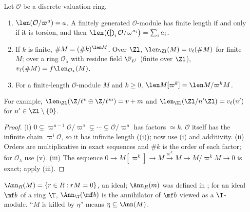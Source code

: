 \begin{proposition}\label{prop:modules:length-dvr}
Let $\mathcal O$ be a discrete valuation ring.
\begin{enumerate}[label=(\roman*)]
\item $\len(\mathcal O/\varpi^a)=a$. A finitely generated $\mathcal O$-module has finite length if and only if it is torsion, and then
$\len\bigl(\bigoplus_i\mathcal O/\varpi^{a_i}\bigr)=\sum_ia_i$.
\item If $k$ is finite, $\#M=(\#k)^{\len M}$. Over $\Zl$, $\len_{\Zl}(M)=v_\ell(\#M)$ for finite $M$; over a ring $\mathcal O_\lambda$ with residue field $\F_{\ell^f}$
(finite over $\Zl$), $v_\ell(\#M)=f\len_{\mathcal O_\lambda}(M)$.
\item For a finite-length $\mathcal O$-module $M$ and $k\ge0$, $\len M[\varpi^k]=\len M/\varpi^kM$.
\end{enumerate}
For example, $\len_{\Zl}(\Z/\ell^v\oplus\Z/\ell^m)=v+m$ and $\len_{\Zl}(\Zl/n'\Zl)=v_\ell(n')$ for $n'\in\Zl\setminus\{0\}$.
\end{proposition}

\begin{proof}
(i) $0\subsetneq\varpi^{a-1}\mathcal O/\varpi^a\subsetneq\cdots\subsetneq\mathcal O/\varpi^a$ has factors $\simeq k$. $\mathcal O$ itself has the infinite chain $\varpi^i\mathcal O$, so it has infinite
length ((i)); now use (i) and additivity. (ii) Orders are multiplicative in
exact sequences and $\#k$ is the order of each factor; for $\mathcal O_\lambda$ use (v). (iii) The sequence
$0\to M[\varpi^k]\to M\xrightarrow{\varpi^k}M\to M/\varpi^kM\to0$ is exact; apply (iii).
\end{proof}

\begin{definition}[annihilators]\label{def:modules:annihilator}
$\Ann_R(M)=\{r\in R:rM=0\}$, an ideal; $\Ann_R(m)$ was defined in ; for an ideal $\mf b$ of a ring $\T$,
$\Ann_\T(\mf b)$ is the annihilator of $\mf b$ viewed as a $\T$-module. ``$M$ is killed by $\eta$'' means $\eta\subseteq\Ann(M)$.
\end{definition}

